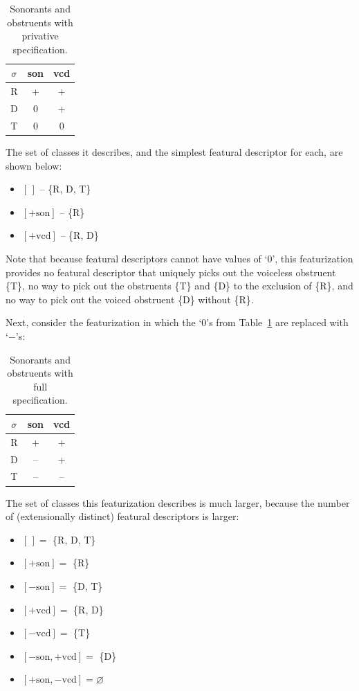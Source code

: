 \documentclass[11pt, oneside]{article}   	%
\begin{document}
\begin{table}[h]
    \centering
    \begin{tabular} {|c||c|c|}
    \hline
        $\sigma$ & son & vcd \\ \hline
        R & + & + \\
        D & 0 & + \\
        T & 0 & 0 \\
        \hline
    \end{tabular}
    \caption{Sonorants and obstruents with privative specification.}
    \label{table:privative}
\end{table}

\noindent The set of classes it describes, and the simplest featural descriptor for each, are shown below: \begin{itemize}
  \item $[\,]$ -- \{R, D, T\}
  \item $[+\text{son}]$ -- \{R\}
  \item $[+\text{vcd}]$ -- \{R, D\}
  \end{itemize}
  
\noindent Note that because featural descriptors cannot have values of `0', this featurization provides no featural descriptor that uniquely picks out the voiceless obstruent \{T\}, no way to pick out the obstruents \{T\} and \{D\} to the exclusion of \{R\}, and no way to pick out the voiced obstruent \{D\} without \{R\}.

Next, consider the featurization in which the `$0$'s from Table~\ref{table:privative} are replaced with `$-$'s:

\begin{table}[h]
    \centering
    \begin{tabular} {|c||c|c|}
    \hline
        $\sigma$ & son & vcd \\ \hline
        R & + & + \\
        D & -- & + \\
        T & -- & -- \\
        \hline
    \end{tabular}
    \caption{Sonorants and obstruents with full specification.}
    \label{table:full}
\end{table}

\noindent The set of classes this featurization describes is much larger, because the number of (extensionally distinct) featural descriptors is larger: \begin{itemize}
    \item $[\,] =$ \{R, D, T\}
    \item $[+\text{son}] =$ \{R\}
    \item $[-\text{son}] =$ \{D, T\}
    \item $[+\text{vcd}] =$ \{R, D\}
    \item $[-\text{vcd}] =$ \{T\}
    \item $[-\text{son},+\text{vcd}] =$ \{D\}
    \item $[+\text{son},-\text{vcd}] = \varnothing$
    \end{itemize}
\end{document}
